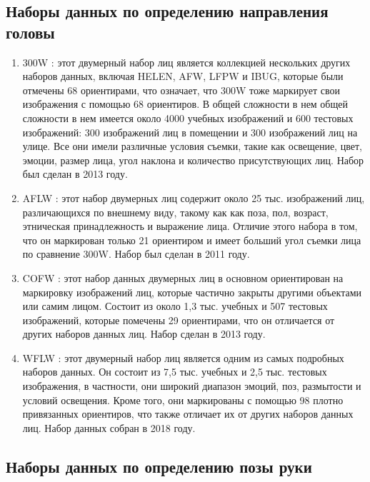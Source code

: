 \subsection{Наборы данных по определению направления головы}

\begin{enumerate}[label=\arabic*)]
	
	\item 300W \cite{300-W}: этот двумерный набор лиц является коллекцией нескольких других наборов данных, включая HELEN, AFW, LFPW и IBUG, которые были отмечены 68 ориентирами, что означает, что 300W тоже маркирует свои изображения с помощью 68 ориентиров.
	В общей сложности в нем общей сложности в нем имеется около 4000 учебных изображений и 600 тестовых изображений: 300 изображений лиц в помещении и 300 изображений лиц на улице.
	Все они имели различные условия съемки, такие как освещение, цвет, эмоции, размер лица, угол наклона и количество присутствующих лиц.
	Набор был сделан в 2013 году.
	
	\item AFLW \cite{AFLW}: этот набор двумерных лиц содержит около 25 тыс. изображений лиц, различающихся по внешнему виду, такому как как поза, пол, возраст, этническая принадлежность и выражение лица.
	Отличие этого набора в том, что он маркирован только 21 ориентиром и имеет больший угол съемки лица по сравнение 300W.
	Набор был сделан в 2011 году.
	
	\item COFW \cite{COFW}: этот набор данных двумерных лиц в основном ориентирован на маркировку изображений лиц, которые частично закрыты другими объектами или самим лицом.
	Состоит из около 1,3 тыс. учебных и 507 тестовых изображений, которые помечены 29 ориентирами, что он отличается от других наборов данных лиц.
	Набор сделан в 2013 году.
	
	\item WFLW \cite{WFLW}: этот двумерный набор лиц является одним из самых подробных наборов данных. 
	Он состоит из 7,5 тыс. учебных и 2,5 тыс. тестовых изображения, в частности, они широкий диапазон эмоций, поз, размытости и условий освещения.
	Кроме того, они маркированы с помощью 98 плотно привязанных ориентиров, что также отличает их от других наборов данных лиц.
	Набор данных собран в 2018 году. 
	
	
\end{enumerate}

\subsection{Наборы данных по определению позы руки}

